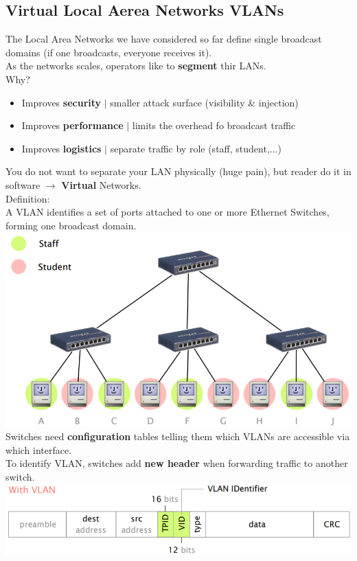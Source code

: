 \documentclass[a4paper, fontsize=8pt, landscape, DIV=1]{scrartcl}
\begin{document}
\begin{multicols*}{4}
   		\subsection{Virtual Local Aerea Networks VLANs}
   		The Local Area Networks we have considered so far define single broadcast domains (if one broadcasts, everyone receives it).\\
   		As the networks scales, operators like to \textbf{segment} thir LANs.\\
   		Why?
   		\begin{itemize}[noitemsep]
   			\item Improves \textbf{security} $\vert$ smaller attack surface (visibility \& injection)
   			\item Improves \textbf{performance} $\vert$ limits the overhead fo broadcast traffic 
   			\item Improves \textbf{logistics} $\vert$ separate traffic by role (staff, student,...)
   		\end{itemize} 
   		You do not want to separate your LAN physically (huge pain), but reader do it in software $\rightarrow$ \textbf{Virtual} Networks.\\
   		Definition:\\
   		A VLAN identifies a set of ports attached to one or more Ethernet Switches, forming one broadcast domain. 
   		\includegraphics[width=\columnwidth]{images/Link_Layer/VLAN.png}
   		Switches need \textbf{configuration} tables telling them which VLANs are accessible via which interface.\\
   		To identify VLAN, switches add \textbf{new header} when forwarding traffic to another switch.  
   		\includegraphics[width=\columnwidth]{images/Link_Layer/VLAN_header.png}

\end{multicols*}
\end{document}
